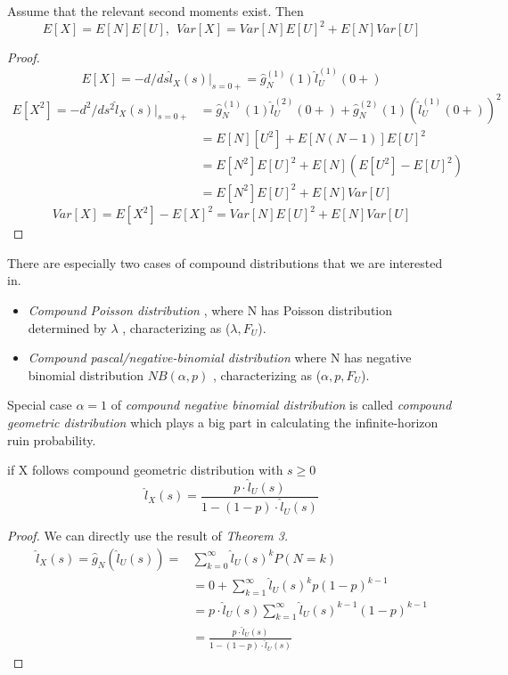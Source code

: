 \documentclass[project2.tex]{subfiles}
\begin{document}
\begin{corollary}
Assume that the relevant second moments exist. Then
$$E[X]=E[N]E[U],\hspace{5pt}Var[X]=Var[N]E[U]^2+E[N]Var[U]$$
\end{corollary}
\begin{proof}
$$E[X]=-d/ds \hat{l}_X(s)|_{s=0+}=\hat{g}^{(1)}_N(1)\hat{l}^{(1)}_U(0+)$$
\begin{align*}
E[X^2]=-d^2/ds^2 \hat{l}_X(s)|_{s=0+}&=\hat{g}^{(1)}_N(1)\hat{l}^{(2)}_U(0+)+\hat{g}^{(2)}_N(1)(\hat{l}^{(1)}_U(0+))^2\\
&=E[N][U^2]+E[N(N-1)]E[U]^2\\
&=E[N^2]E[U]^2+E[N](E[U^2]-E[U]^2)\\
&=E[N^2]E[U]^2+E[N]Var[U]
\end{align*}
$$Var[X]=E[X^2]-E[X]^2=Var[N]E[U]^2+E[N]Var[U]$$
\end{proof}
There are especially two cases of compound distributions that we are interested in.
\begin{definition}
\end{definition}
\begin{itemize}
\item {\it Compound Poisson distribution} , where N has Poisson distribution determined by $\lambda$ , characterizing as ($\lambda,F_U$).
\item {\it Compound pascal/negative-binomial distribution} where N has negative binomial distribution $NB(\alpha,p)$ , characterizing as ($\alpha,p,F_U$).
\end{itemize}
Special case $\alpha=1$ of {\it compound negative binomial  distribution} is called {\it compound  geometric distribution} which plays a big part in calculating the infinite-horizon ruin probability.
\begin{corollary}
if X follows compound geometric distribution with $s\geq 0$
$$\hat{l}_X(s)=\frac{p\cdot\hat{l}_U(s)}{1-(1-p)\cdot\hat{l}_U(s)}
$$
\end{corollary}
\begin{proof}
We can directly use the result of {\it Theorem 3.}
\begin{align*}
\hat{l}_X(s)=\hat{g}_N(\hat{l}_U(s))=&\sum^{\infty}_{k=0}\hat{l}_U(s)^kP(N=k)\\
&=0+\sum^{\infty}_{k=1}\hat{l}_U(s)^kp(1-p)^{k-1}\\
&=p\cdot\hat{l}_U(s)\sum^{\infty}_{k=1}\hat{l}_U(s)^{k-1}(1-p)^{k-1}\\
&=\frac{p\cdot\hat{l}_U(s)}{1-(1-p)\cdot\hat{l}_U(s)}
\end{align*}
\end{proof}
\end{document}
